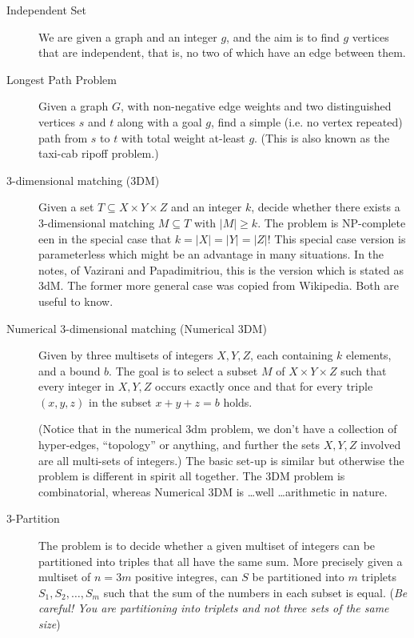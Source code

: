 \begin{description}
\item[{Independent Set}] We are given a graph and an integer \(g\), and the aim is to find \(g\) vertices
that are independent, that is, no two of which have an edge between them.

\item[{Longest Path Problem}] Given a graph \(G\), with non-negative edge weights and two distinguished vertices
\(s\) and \(t\) along with a goal \(g\), find a simple (i.e. no vertex repeated) path from \(s\) to \(t\)
with total weight at-least \(g\). (This is also known as the taxi-cab ripoff problem.)
\item[{3-dimensional matching (3DM)}] Given a set \(T \subseteq X\times Y\times Z\) and an integer \(k\), decide
whether there exists a 3-dimensional matching \(M \subseteq T\) with \(|M|\geq k\). 
The problem is NP-complete een in the special case that \(k=|X|=|Y|=|Z|\)! This special case 
version is parameterless which might be an advantage in many situations. In the notes, of 
Vazirani and Papadimitriou, this is the version which is stated as 3dM. The former more general
case was copied from Wikipedia. Both are useful to know.

\item[{Numerical 3-dimensional matching (Numerical 3DM)}] Given by three multisets of integers 
\(X,Y,Z\), each containing \(k\)
elements, and a bound \(b\). The goal is to select a subset 
\(M\) of \(X \times Y \times Z\)  such that every integer in \(X,Y,Z\)
occurs exactly once and that for every triple \((x,y,z)\) in the subset 
\(x+y+z=b\) holds. 

(Notice that in the numerical 3dm problem, we don't have a collection of hyper-edges, ``topology'' or anything, 
 and further the sets \(X,Y,Z\) involved are all multi-sets of integers.) The basic set-up is similar but otherwise 
 the problem is different in spirit all together. The 3DM problem is combinatorial, whereas Numerical 3DM is 
 \ldots well \ldots arithmetic in nature.

\item[{3-Partition}] The problem is to decide whether a given multiset of integers 
can be partitioned into triples that all have the same sum. More precisely given a multiset of \(n=3m\)
positive integres, can \(S\) be partitioned into \(m\) triplets \(S_1,S_2, \ldots, S_m\) such that the sum of the 
numbers in each subset is equal. 
(\emph{Be careful! You are partitioning into triplets and not three sets of the same size})
\end{description}

